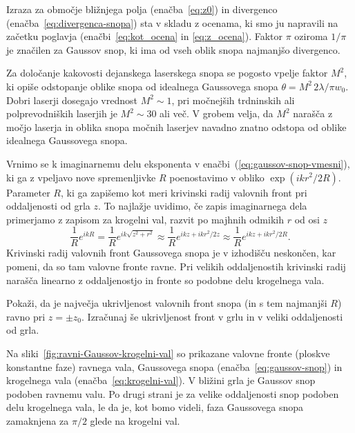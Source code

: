 Izraza za območje bližnjega polja (enačba~\ref{eq:z0}) in divergenco 
(enačba~\ref{eq:divergenca-snopa}) sta v skladu z ocenama, ki smo ju 
napravili na začetku poglavja (enačbi~\ref{eq:kot_ocena} in \ref{eq:z_ocena}). Faktor
$\pi$ oziroma $1/\pi$ je značilen za Gaussov snop, ki ima od vseh oblik snopa 
najmanjšo divergenco. 

\begin{remark}
Za določanje kakovosti dejanskega laserskega snopa se pogosto vpelje faktor $M^2$,
ki opiše odstopanje oblike snopa od idealnega Gaussovega snopa 
$\theta = M^2 \, 2\lambda/\pi w_{0}$. 
Dobri laserji dosegajo vrednost $M^2 \sim 1$,
pri močnejših trdninskih ali polprevodniških laserjih je $M^2 \sim 30$ ali več. 
V grobem velja, da $M^2$ narašča z močjo laserja in oblika snopa močnih laserjev navadno znatno
odstopa od oblike idealnega Gaussovega snopa.  
\end{remark}

Vrnimo se k imaginarnemu delu eksponenta v enačbi~(\ref{eq:gaussov-snop-vmesni}), ki ga
z vpeljavo nove spremenljivke $R$ poenostavimo v obliko $\exp(ikr^2/2R)$. Parameter $R$, ki 
ga zapišemo kot 
meri krivinski radij valovnih front 
pri oddaljenosti od grla $z$. To najlažje
uvidimo, če zapis imaginarnega dela primerjamo z zapisom za krogelni val, razvit 
po majhnih odmikih $r$ od osi
$z$
\begin{equation}
\frac{1}{R}e^{ikR}=\frac{1}{R}e^{ik\sqrt{z^{2}+r^{2}}}\approx \frac{1}{R}e^{ikz+ikr^{2}/2z} \approx \frac{1}{R}e^{ikz+ikr^{2}/2R}.
\label{eq:krogelni-val}
\end{equation}
Krivinski radij valovnih front Gaussovega snopa je v izhodišču neskončen, kar pomeni, da so tam valovne fronte 
ravne. Pri velikih oddaljenostih krivinski radij narašča linearno z oddaljenostjo in fronte
so podobne delu krogelnega vala. 

\begin{definition}
\label{naloga-ukrivljenost-snopa}
Pokaži, da je največja ukrivljenost valovnih front snopa (in s tem najmanjši $R$) ravno pri $z=\pm z_{0}$.
Izračunaj še ukrivljenost front v grlu in v veliki oddaljenosti od grla.
\end{definition}

Na sliki~\ref{fig:ravni-Gaussov-krogelni-val} so prikazane valovne fronte (ploskve konstantne faze)
ravnega vala, Gaussovega snopa (enačba~\ref{eq:gaussov-snop}) 
in krogelnega vala (enačba~\ref{eq:krogelni-val}). V bližini grla je
Gaussov snop podoben ravnemu valu. Po drugi strani je za velike oddaljenosti snop 
podoben delu krogelnega vala, le da je, kot bomo videli, faza Gaussovega snopa 
zamaknjena za $\pi/2$ glede na krogelni val. 

